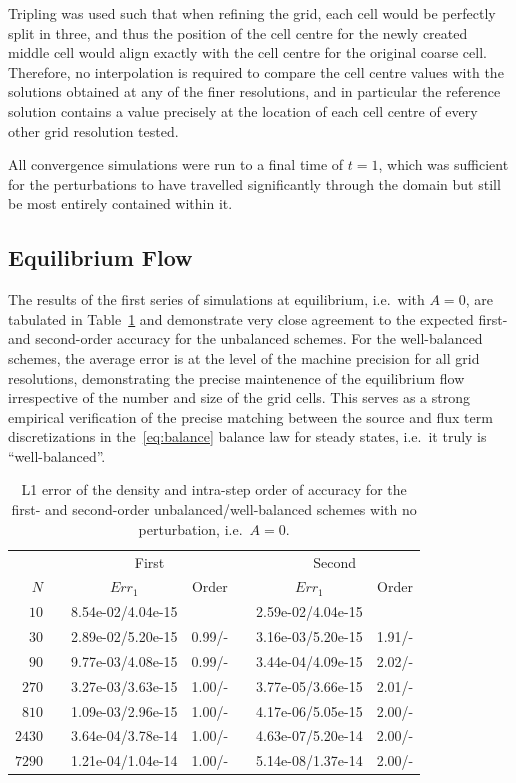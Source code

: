 Tripling was used such that when refining the grid, each cell would be perfectly split in three, and thus the position of the cell centre for the newly created middle cell would align exactly with the cell centre for the original coarse cell. Therefore, no interpolation is required to compare the cell centre values with the solutions obtained at any of the finer resolutions, and in particular the reference solution contains a value precisely at the location of each cell centre of every other grid resolution tested.

All convergence simulations were run to a final time of $t=1$, which was sufficient for the perturbations to have travelled significantly through the domain but still be most entirely contained within it.

\subsection{Equilibrium Flow}

The results of the first series of simulations at equilibrium, i.e.\ with $A=0$, are tabulated in Table~\ref{table:OVS_A0} and demonstrate very close agreement to the expected first- and second-order accuracy for the unbalanced schemes. For the well-balanced schemes, the average error is at the level of the machine precision for all grid resolutions, demonstrating the precise maintenence of the equilibrium flow irrespective of the number and size of the grid cells. This serves as a strong empirical verification of the precise matching between the source and flux term discretizations in the~\eqref{eq:balance} balance law for steady states, i.e.\ it truly is ``well-balanced''.

\begin{table}\centering
\caption{L1 error of the density and intra-step order of accuracy for the first- and second-order unbalanced/well-balanced schemes with no perturbation, i.e.\ $A=0$.}
\label{table:OVS_A0}
\begin{tabular}{@{}rcccccc@{}}\toprule
& \phantom{a} & \multicolumn{2}{c}{First} & \phantom{ab} & \multicolumn{2}{c}{Second}\\
\cmidrule{3-4} \cmidrule{6-7}
$N$ && $Err_1$ & Order && $Err_1$ & Order\\ \midrule
$10$ && 8.54e-02/4.04e-15 &&& 2.59e-02/4.04e-15 &\\
$30$ && 2.89e-02/5.20e-15 & 0.99/- && 3.16e-03/5.20e-15 & 1.91/-\\
$90$ && 9.77e-03/4.08e-15 & 0.99/- && 3.44e-04/4.09e-15 & 2.02/-\\
$270$ && 3.27e-03/3.63e-15 & 1.00/- && 3.77e-05/3.66e-15 & 2.01/-\\
$810$ && 1.09e-03/2.96e-15 & 1.00/- && 4.17e-06/5.05e-15 & 2.00/-\\
$2430$ && 3.64e-04/3.78e-14 & 1.00/- && 4.63e-07/5.20e-14 & 2.00/-\\
$7290$ && 1.21e-04/1.04e-14 & 1.00/- && 5.14e-08/1.37e-14 & 2.00/-\\
\bottomrule
\end{tabular}
\end{table}

